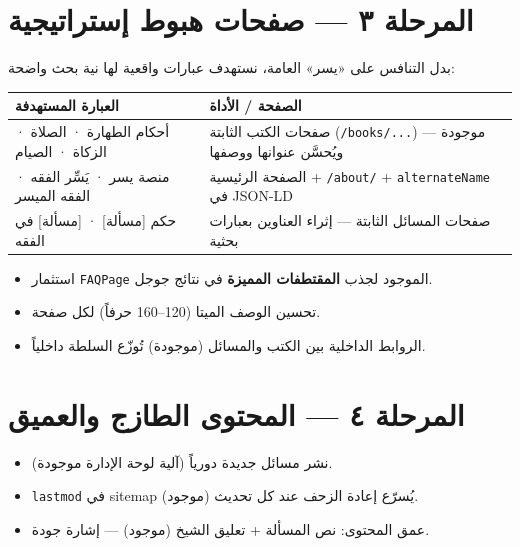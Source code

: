 \documentclass[11pt]{article}
\begin{document}
\section{المرحلة ٣ — صفحات هبوط إستراتيجية}

بدل التنافس على «يسر» العامة، نستهدف عبارات واقعية لها نية بحث واضحة:

\vspace{6pt}
\renewcommand{\arraystretch}{1.35}
\begin{longtable}{@{}p{} p{}@{}}
\toprule
\textbf{العبارة المستهدفة} & \textbf{الصفحة / الأداة} \\
\midrule
\endhead
أحكام الطهارة · الصلاة · الزكاة · الصيام & صفحات الكتب الثابتة (\texttt{/books/...}) — موجودة ويُحسَّن عنوانها ووصفها \\
منصة يسر · يَسِّر الفقه · الفقه الميسر & الصفحة الرئيسية + \texttt{/about/} + \texttt{alternateName} في JSON-LD \\
حكم [مسألة] · [مسألة] في الفقه & صفحات المسائل الثابتة — إثراء العناوين بعبارات بحثية \\
\bottomrule
\end{longtable}
\renewcommand{\arraystretch}{1.0}

\begin{itemize}
  \item استثمار \texttt{FAQPage} الموجود لجذب \textbf{المقتطفات المميزة} في نتائج جوجل.
  \item تحسين الوصف الميتا (120--160 حرفاً) لكل صفحة.
  \item الروابط الداخلية بين الكتب والمسائل (موجودة) تُوزّع السلطة داخلياً.
\end{itemize}

\section{المرحلة ٤ — المحتوى الطازج والعميق}

\begin{itemize}
  \item نشر مسائل جديدة دورياً (آلية لوحة الإدارة موجودة).
  \item \texttt{lastmod} في sitemap (موجود) يُسرّع إعادة الزحف عند كل تحديث.
  \item عمق المحتوى: نص المسألة + تعليق الشيخ (موجود) — إشارة جودة.
\end{itemize}

\end{document}
